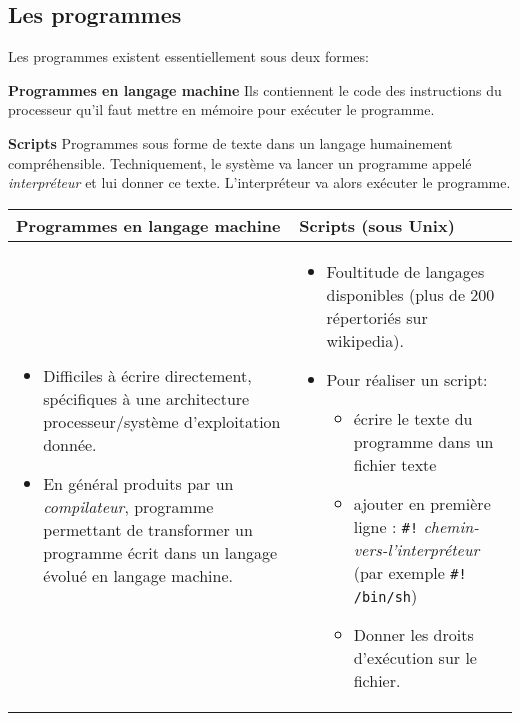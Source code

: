 \subsection{Les programmes}

\begin{prop}
Les programmes existent essentiellement sous deux formes:

\item \textbf{Programmes en langage machine} Ils contiennent le code des
  instructions du processeur qu'il faut mettre en mémoire pour
  exécuter le programme.
\item \textbf{Scripts} Programmes sous forme de texte dans un langage
  humainement compréhensible. Techniquement, le système va lancer un
  programme appelé \emph{interpréteur} et lui donner ce
  texte. L'interpréteur va alors exécuter le programme.
\end{prop}

\begin{center}
\begin{tabular}{|p{}|p{}|}
\hline
\textbf{Programmes en langage machine}& \textbf{Scripts (sous Unix)}\\
\hline
\begin{itemize}
\item Difficiles à écrire directement, spécifiques à une architecture
  processeur/système d'exploitation donnée.
\item En général produits par un \emph{compilateur}, programme
  permettant de transformer un programme écrit dans un langage évolué
  en langage machine.
\end{itemize}
&
\begin{itemize}
\item Foultitude de langages disponibles (plus de 200 répertoriés sur
  wikipedia).
\item Pour réaliser un script:
  \begin{itemize}
  \item écrire le texte du programme dans un fichier texte
  \item ajouter en première ligne :
    \verb+#!+ \emph{chemin-vers-l'interpréteur}
    (par exemple \verb+#! /bin/sh+)
  \item Donner les droits d'exécution sur le fichier.
  \end{itemize}
\end{itemize}
\\
\hline
\end{tabular}
\end{center}



